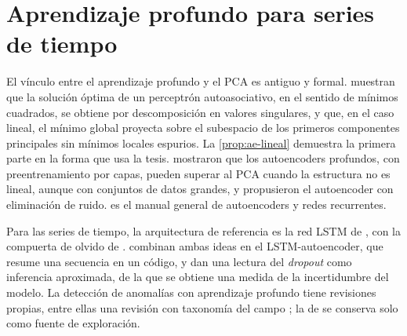 \section{Aprendizaje profundo para series de tiempo}
\label{sec:ea-dl}

El vínculo entre el aprendizaje profundo y el PCA es antiguo y formal.
\textcite{bourlard_kamp_1988} muestran que la solución óptima de un perceptrón autoasociativo, en el sentido de
mínimos cuadrados, se obtiene por descomposición en valores singulares, y
\textcite{baldi_hornik_1989} que, en el caso
lineal, el mínimo global proyecta sobre el subespacio de los primeros componentes principales sin
mínimos locales espurios. La \cref{prop:ae-lineal} demuestra la primera parte en la forma que usa
la tesis. \textcite{hinton_salakhutdinov_2006} mostraron que los autoencoders profundos, con
preentrenamiento por capas, pueden superar al PCA cuando la estructura no es lineal, aunque con
conjuntos de datos grandes, y \textcite{vincent_et_al_2008} propusieron el autoencoder con eliminación de ruido. \textcite{goodfellow_bengio_courville_2016}
es el manual general de autoencoders y redes recurrentes.

Para las series de tiempo, la arquitectura de referencia es la red LSTM de
\textcite{hochreiter_schmidhuber_1997}, con la compuerta de olvido de
\textcite{gers_schmidhuber_cummins_2000}. \textcite{srivastava_mansimov_salakhutdinov_2015} combinan ambas ideas en el LSTM-autoencoder, que resume una secuencia en un
código, y \textcite{gal_ghahramani_2016} dan
una lectura del \emph{dropout} como inferencia aproximada, de la que se obtiene una medida de la
incertidumbre del modelo. La detección de anomalías con aprendizaje profundo tiene revisiones
propias, entre ellas una revisión con taxonomía del campo
\parencite{pang_et_al_2021}; la de \textcite{chalapathy_chawla_2019} se conserva solo como fuente de exploración.

